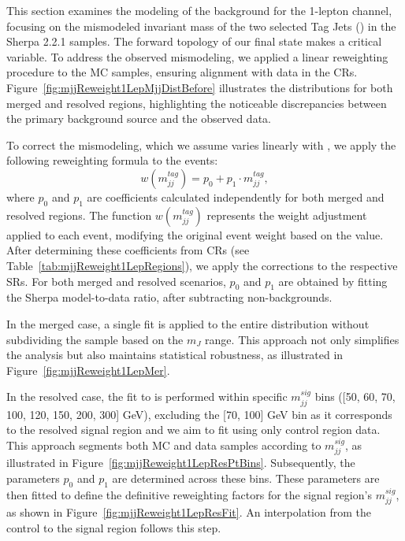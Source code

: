 \label{subsec:mjj_reweight}
\label{subsec:mjj_reweight_1lep}

This section examines the modeling of the \Wjets background for the 1-lepton channel, focusing on the mismodeled invariant mass of the two selected Tag Jets (\mjjtag) in the Sherpa 2.2.1 \Vjets samples. The forward topology of our final state makes \mjjtag a critical variable. To address the observed mismodeling, we applied a linear reweighting procedure to the \Wjets MC samples, ensuring alignment with data in the CRs. 
Figure~\ref{fig:mjjReweight1LepMjjDistBefore} illustrates the \mjjtag distributions for both merged and resolved regions, highlighting the noticeable discrepancies between the primary background source and the observed data.

To correct the mismodeling, which we assume varies linearly with \mjjtag, we apply the following reweighting formula to the \Wjets events:
\begin{equation}
  w(m_{jj}^{tag}) =  p_0 + p_1 \cdot m_{jj}^{tag} ,
\end{equation}
%
where $p_0$ and $p_1$
are coefficients calculated independently for both merged and resolved regions.
The function $w(m_{jj}^{tag})$ represents the weight adjustment applied to each event, modifying the original event weight based on the \mjjtag value.
After determining these coefficients from CRs (see Table~\ref{tab:mjjReweight1LepRegions}), we apply the corrections to the respective SRs. 
For both merged and resolved scenarios, $p_0$ and $p_1$ are obtained by fitting the Sherpa \Wjets model-to-data ratio, after subtracting non-\Wjets backgrounds.

In the merged case, a single fit is applied to the entire \mjjtag distribution without subdividing the sample based on the $m_{J}$ range. This approach not only simplifies the analysis but also maintains statistical robustness, as illustrated in Figure~\ref{fig:mjjReweight1LepMer}.

In the resolved case, the fit to \mjjtag is performed within specific $m_{jj}^{sig}$ bins ([50, 60, 70, 100, 120, 150, 200, 300] GeV), excluding the [70, 100] GeV bin as it corresponds to the resolved signal region and we aim to fit using only control region data.
This approach segments both MC and data samples according to $m_{jj}^{sig}$, as illustrated in Figure~\ref{fig:mjjReweight1LepResPtBins}. Subsequently, the parameters $p_0$ and $p_1$ are determined across these bins. These parameters are then fitted to define the definitive reweighting factors for the signal region's $m_{jj}^{sig}$, as shown in Figure~\ref{fig:mjjReweight1LepResFit}. An interpolation from the control to the signal region follows this step.

